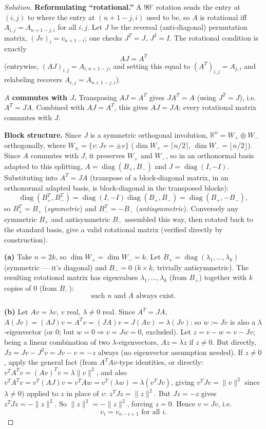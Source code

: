 \documentclass[11pt]{article}
\theoremstyle{definition}
\newcommand{\R}{\mathbb{R}}
\begin{document}
\begin{proof}[Solution]
\textbf{Reformulating ``rotational.''} A $90^\circ$ rotation sends the entry at $(i,j)$ to where the entry at $(n+1-j,i)$ used to be, so $A$ is rotational iff $A_{i,j}=A_{n+1-j,i}$ for all $i,j$. Let $J$ be the reversal (anti-diagonal) permutation matrix, $(Jv)_i=v_{n+1-i}$; one checks $J^T=J$, $J^2=I$. The rotational condition is exactly
\[
AJ=A^T
\]
(entrywise, $(AJ)_{i,j}=A_{i,n+1-j}$, and setting this equal to $(A^T)_{i,j}=A_{j,i}$ and relabeling recovers $A_{i,j}=A_{n+1-j,i}$).

\textbf{$A$ commutes with $J$.} Transposing $AJ=A^T$ gives $JA^T=A$ (using $J^T=J$), i.e.\ $A^T=JA$. Combined with $AJ=A^T$, this gives $AJ=JA$: every rotational matrix commutes with $J$.

\textbf{Block structure.} Since $J$ is a symmetric orthogonal involution, $\R^n=W_+\oplus W_-$ orthogonally, where $W_\pm=\{v:Jv=\pm v\}$ ($\dim W_+=\lceil n/2\rceil$, $\dim W_-=\lfloor n/2\rfloor$). Since $A$ commutes with $J$, it preserves $W_+$ and $W_-$, so in an orthonormal basis adapted to this splitting, $A=\operatorname{diag}(B_+,B_-)$ and $J=\operatorname{diag}(I,-I)$. Substituting into $A^T=JA$ (transpose of a block-diagonal matrix, in an orthonormal adapted basis, is block-diagonal in the transposed blocks):
\[
\operatorname{diag}(B_+^T,B_-^T) = \operatorname{diag}(I,-I)\operatorname{diag}(B_+,B_-) = \operatorname{diag}(B_+,-B_-),
\]
so $B_+^T=B_+$ (\emph{symmetric}) and $B_-^T=-B_-$ (\emph{antisymmetric}). Conversely any symmetric $B_+$ and antisymmetric $B_-$ assembled this way, then rotated back to the standard basis, give a valid rotational matrix (verified directly by construction).

\textbf{(a)} Take $n=2k$, so $\dim W_+=\dim W_-=k$. Let $B_+=\operatorname{diag}(\lambda_1,\dots,\lambda_k)$ (symmetric — it's diagonal) and $B_-=0$ ($k\times k$, trivially antisymmetric). The resulting rotational matrix has eigenvalues $\lambda_1,\dots,\lambda_k$ (from $B_+$) together with $k$ copies of $0$ (from $B_-$):
\[
\boxed{\text{such } n \text{ and } A \text{ always exist}}.
\]

\textbf{(b)} Let $Av=\lambda v$, $v$ real, $\lambda\neq0$ real. Since $A^T=JA$, $A(Jv)=(AJ)v=A^Tv=(JA)v=J(Av)=\lambda(Jv)$: so $w:=Jv$ is also a $\lambda$-eigenvector (or $0$; but $w=0\Rightarrow v=Jw=0$, excluded). Let $z=v-w=v-Jv$; being a linear combination of two $\lambda$-eigenvectors, $Az=\lambda z$ if $z\neq0$. But directly, $Jz=Jv-J^2v=Jv-v=-z$ always (no eigenvector assumption needed). If $z\neq0$, apply the general fact (from $A^TAv$-type identities, or directly: $v^TA^Tv=(Av)^Tv=\lambda\|v\|^2$, and also $v^TA^Tv=v^T(AJ)v=v^TAw=v^T(\lambda w)=\lambda(v^TJv)$, giving $v^TJv=\|v\|^2$ since $\lambda\neq0$) applied to $z$ in place of $v$: $z^TJz=\|z\|^2$. But $Jz=-z$ gives $z^TJz=-\|z\|^2$. So $\|z\|^2=-\|z\|^2$, forcing $z=0$. Hence $v=Jv$, i.e.\
\[
\boxed{v_i=v_{n-i+1} \text{ for all } i}.
\]
\end{proof}
\end{document}
